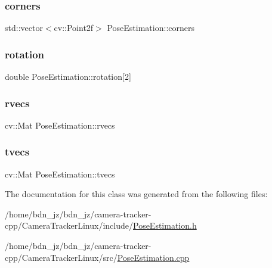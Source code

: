 \subsubsection{\texorpdfstring{corners}{corners}}
{\footnotesize\ttfamily std\+::vector$<$cv\+::\+Point2f$>$ Pose\+Estimation\+::corners\hspace{0.3cm}{\ttfamily [private]}}

\mbox{\label{class_pose_estimation_a6f4078b9cf03b4dbee49cfcd32bc0b07}} 
\subsubsection{\texorpdfstring{rotation}{rotation}}
{\footnotesize\ttfamily double Pose\+Estimation\+::rotation\mbox{[}2\mbox{]}\hspace{0.3cm}{\ttfamily [private]}}

\mbox{\label{class_pose_estimation_a58c73c54cbdab59e168f1645c6cba239}} 
\subsubsection{\texorpdfstring{rvecs}{rvecs}}
{\footnotesize\ttfamily cv\+::\+Mat Pose\+Estimation\+::rvecs\hspace{0.3cm}{\ttfamily [private]}}

\mbox{\label{class_pose_estimation_a60141045de99ad2f8b9c87471a198afe}} 
\subsubsection{\texorpdfstring{tvecs}{tvecs}}
{\footnotesize\ttfamily cv\+::\+Mat Pose\+Estimation\+::tvecs\hspace{0.3cm}{\ttfamily [private]}}



The documentation for this class was generated from the following files\+:\begin{DoxyCompactItemize}
\item 
/home/bdn\+\_\+jz/bdn\+\_\+jz/camera-\/tracker-\/cpp/\+Camera\+Tracker\+Linux/include/\hyperlink{_pose_estimation_8h}{Pose\+Estimation.\+h}\item 
/home/bdn\+\_\+jz/bdn\+\_\+jz/camera-\/tracker-\/cpp/\+Camera\+Tracker\+Linux/src/\hyperlink{_pose_estimation_8cpp}{Pose\+Estimation.\+cpp}\end{DoxyCompactItemize}
